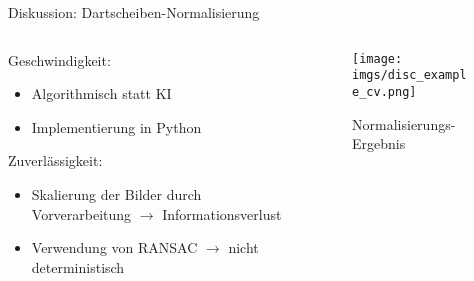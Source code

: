 \begin{frame}{Diskussion: Dartscheiben-Normalisierung}
    \begin{columns}
        \begin{column}{0.7\linewidth}

            Geschwindigkeit:\\
            \begin{itemize}
                \item Algorithmisch statt KI
                \item Implementierung in Python
            \end{itemize}

            Zuverlässigkeit:\\
            \begin{itemize}
                \item Skalierung der Bilder durch Vorverarbeitung $\rightarrow$ Informationsverlust
                \item Verwendung von RANSAC $\rightarrow$ nicht deterministisch
            \end{itemize}

        \end{column}
        \begin{column}{0.3\linewidth}

            \begin{figure}
                \centering
                \texttt{[image: imgs/disc\_example\_cv.png]}
                \caption{Normalisierungs-Ergebnis}
            \end{figure}

        \end{column}
    \end{columns}
\end{frame}

